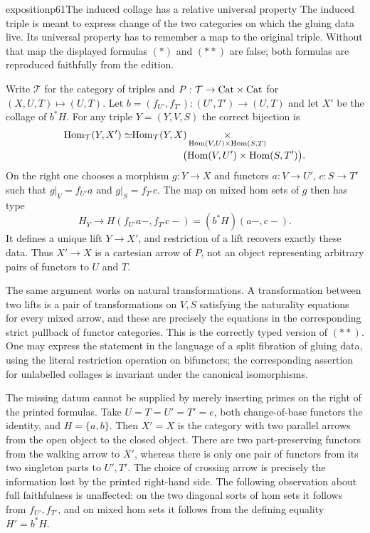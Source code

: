 \begin{dcomment}{exposition}{p61}{The induced collage has a relative universal property}
The induced triple is meant to express change of the two categories on which the gluing data live. Its universal property has to remember a map to the original triple. Without that map the displayed formulas $(*)$ and $(**)$ are false; both formulas are reproduced faithfully from the edition.

Write $\mathcal T$ for the category of triples and $P:\mathcal T\to\mathrm{Cat}\times\mathrm{Cat}$ for $(X,U,T)\mapsto(U,T)$. Let $b=(f_{U'},f_{T'}):(U',T')\to(U,T)$ and let $X'$ be the collage of $b^*H$. For any triple $Y=(Y,V,S)$ the correct bijection is
\[
\begin{split}
 \Hom_{\mathcal T}(Y,X')\simeq
 &\Hom_{\mathcal T}(Y,X)\mathop{\times}_{
 \Hom(V,U)\times\Hom(S,T)}\\[-2pt]
 &\hspace{18mm}\bigl(\Hom(V,U')\times\Hom(S,T')\bigr).
\end{split}
\]
On the right one chooses a morphism $g:Y\to X$ and functors $a:V\to U'$, $c:S\to T'$ such that $g|_V=f_{U'}a$ and $g|_S=f_{T'}c$. The map on mixed hom sets of $g$ then has type
\[
 H_Y\longrightarrow H(f_{U'}a-,f_{T'}c-)
                 =(b^*H)(a-,c-).
\]
It defines a unique lift $Y\to X'$, and restriction of a lift recovers exactly these data. Thus $X'\to X$ is a cartesian arrow of $P$, not an object representing arbitrary pairs of functors to $U$ and $T$.

The same argument works on natural transformations. A transformation between two lifts is a pair of transformations on $V,S$ satisfying the naturality equations for every mixed arrow, and these are precisely the equations in the corresponding strict pullback of functor categories. This is the correctly typed version of $(**)$. One may express the statement in the language of a split fibration of gluing data, using the literal restriction operation on bifunctors; the corresponding assertion for unlabelled collages is invariant under the canonical isomorphisms.

The missing datum cannot be supplied by merely inserting primes on the right of the printed formulas. Take $U=T=U'=T'=e$, both change-of-base functors the identity, and $H=\{a,b\}$. Then $X'=X$ is the category with two parallel arrows from the open object to the closed object. There are two part-preserving functors from the walking arrow to $X'$, whereas there is only one pair of functors from its two singleton parts to $U',T'$. The choice of crossing arrow is precisely the information lost by the printed right-hand side. The following observation about full faithfulness is unaffected: on the two diagonal sorts of hom sets it follows from $f_{U'},f_{T'}$, and on mixed hom sets it follows from the defining equality $H'=b^*H$.
\end{dcomment}


